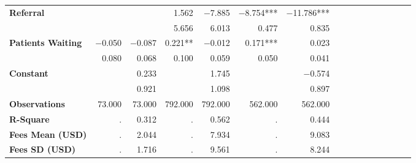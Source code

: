 \begin{tabular}{@{\extracolsep{5pt}}lrrrrrrrrrrrrrrr}
{\bf Referral} & \phantom{***} & \phantom{***} & 1.562\phantom{\phantom{)}***} & $-$7.885\phantom{\phantom{)}***} & $-$8.754\phantom{)}*** & $-$11.786\phantom{)}*** \\
{\bf } & \phantom{***} & \phantom{***} & 5.656\phantom{\phantom{)}***} & 6.013\phantom{\phantom{)}***} & 0.477\phantom{\phantom{)}***} & 0.835\phantom{\phantom{)}***} \\
{\bf Patients Waiting} & $-$0.050\phantom{\phantom{)}***} & $-$0.087\phantom{\phantom{)}***} & 0.221\phantom{)}**\phantom{*} & $-$0.012\phantom{\phantom{)}***} & 0.171\phantom{)}*** & 0.023\phantom{\phantom{)}***} \\
{\bf } & 0.080\phantom{\phantom{)}***} & 0.068\phantom{\phantom{)}***} & 0.100\phantom{\phantom{)}***} & 0.059\phantom{\phantom{)}***} & 0.050\phantom{\phantom{)}***} & 0.041\phantom{\phantom{)}***} \\
{\bf Constant} & \phantom{***} & 0.233\phantom{\phantom{)}***} & \phantom{***} & 1.745\phantom{\phantom{)}***} & \phantom{***} & $-$0.574\phantom{\phantom{)}***} \\
{\bf } & \phantom{***} & 0.921\phantom{\phantom{)}***} & \phantom{***} & 1.098\phantom{\phantom{)}***} & \phantom{***} & 0.897\phantom{\phantom{)}***} \\
{\bf Observations} & 73.000\phantom{\phantom{)}***} & 73.000\phantom{\phantom{)}***} & 792.000\phantom{\phantom{)}***} & 792.000\phantom{\phantom{)}***} & 562.000\phantom{\phantom{)}***} & 562.000\phantom{\phantom{)}***} \\
{\bf R-Square} & .\phantom{***} & 0.312\phantom{***} & .\phantom{***} & 0.562\phantom{***} & .\phantom{***} & 0.444\phantom{***} \\
{\bf Fees Mean (USD)} & .\phantom{***} & 2.044\phantom{***} & .\phantom{***} & 7.934\phantom{***} & .\phantom{***} & 9.083\phantom{***} \\
{\bf Fees SD (USD)} & .\phantom{***} & 1.716\phantom{***} & .\phantom{***} & 9.561\phantom{***} & .\phantom{***} & 8.244\phantom{***} \\
\hline
\end{tabular}
